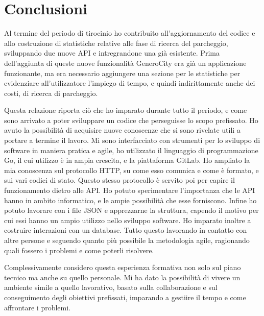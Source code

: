 \documentclass[italian, Lau, oneside, nodefaultfont, noexaminfo]{sapthesis}
\begin{document}
\bigskip

\chapter*{Conclusioni}

Al termine del periodo di tirocinio ho contribuito all'aggiornamento del codice e allo costruzione di statistiche relative alle fase di ricerca del parcheggio, sviluppando due nuove API e intregrandone una già esistente.  Prima dell'aggiunta di queste nuove funzionalità GeneroCity era già un applicazione funzionante, ma era necessario aggiungere una sezione per le statistiche per evidenziare all'utilizzatore l'impiego di tempo, e  quindi indirittamente anche dei costi, di ricerca di parcheggio. 

\noindent Questa relazione riporta ciò che ho imparato durante tutto il periodo, e come sono arrivato a poter sviluppare un codice che perseguisse lo scopo prefissato. Ho avuto la possibilità di acquisire nuove conoscenze che si sono rivelate utili a portare a termine il lavoro. Mi sono interfacciato con strumenti per lo sviluppo di software in maniera pratica e agile, ho utilizzato il linguaggio di programmazione Go, il cui utilizzo è in ampia crescita, e la piattaforma  GitLab. Ho ampliato la mia conoscenza sul protocollo HTTP, su come esso comunica e come è formato, e sui vari codici di stato. Questo stesso protocollo è servito poi per capire il funzionamento dietro alle API. Ho potuto sperimentare  l'importanza che le API hanno in ambito informatico, e le ampie possibilità che esse forniscono. Infine ho potuto lavorare con i file JSON e apprezzarne la struttura, capendo il motivo per cui essi hanno un ampio utilizzo nello sviluppo software. Ho imparato inoltre a costruire interazioni con un database. Tutto questo lavorando in contatto con altre persone e seguendo quanto più possibile la metodologia agile, ragionando quali fossero i problemi e come poterli risolvere. 


\noindent Complessivamente considero questa esperienza formativa non solo sul piano tecnico ma anche su quello personale. Mi ha dato la possibilità di vivere un ambiente simile a quello lavorativo, basato sulla collaborazione e sul conseguimento degli obiettivi prefissati, imparando a gestiire il tempo e come affrontare i problemi. \\
\end{document}
